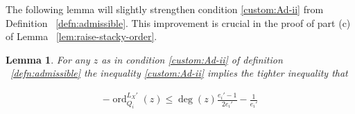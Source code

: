 \documentclass{amsart}
\theoremstyle{plain}
\newtheorem{lem}[thm]{Lemma}
\theoremstyle{definition}
\theoremstyle{remark}
\numberwithin{equation}{section}
\newcommand\BN{{\mathbb N}}
\DeclareMathOperator{\ord}{ord}
\newcommand\sx{\mathscr X}
\newcommand \subhalf[1]{\frac{{#1} - 1}{2{#1}}}
\newcommand{\halfcan}{L}
\begin{document}
%

The following lemma will slightly strengthen condition \ref{custom:Ad-ii} from Definition ~\ref{defn:admissible}. This improvement is crucial in the proof of part (c) of Lemma ~\ref{lem:raise-stacky-order}.

\begin{lem}
\label{lem:admissible_inequality}
For any $z$ as in condition \ref{custom:Ad-ii} of definition ~\ref{defn:admissible} the inequality \ref{custom:Ad-ii} implies the
tighter inequality that

\begin{align*}
	-\ord_{Q_i}
^{\halfcan_X'}(z) \leq \deg(z) \subhalf{e_i'} -\frac{1}{e_i'}
\end{align*}
\end{lem}
\end{document}
